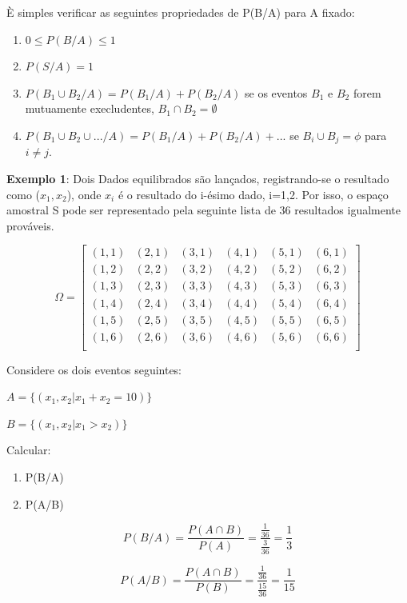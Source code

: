 È simples verificar as seguintes propriedades de P(B/A) para A
fixado:

\begin{enumerate}
    \item $0 \leq P(B/A) \leq 1$
    \item $P(S/A)=1$
     \item $P(B_{1} \cup B_{2}/A) = P(B_{1}/A)+P(B_{2}/A)$ se os
     eventos $B_{1}$ e $B_{2}$ forem mutuamente execludentes, $B_{1}\cap B_{2}=\emptyset$
     \item $P(B_{1} \cup B_{2} \cup ... / A) =
     P(B_{1}/A)+P(B_{2}/A)+...$ se $B_{i}\cup B_{j}=\phi$ para $i\neq
     j$.
\end{enumerate}



\textbf{Exemplo 1}: Dois Dados equilibrados são lançados,
registrando-se o resultado como ($x_{1},x_{2}$), onde $x_{i}$ é o
resultado do i-ésimo dado, i=1,2. Por isso, o espaço amostral S
pode ser representado pela seguinte lista de 36 resultados
igualmente prováveis.


$$
\Omega =
\left[%
\begin{array}{cccccc}
  (1,1) & (2,1) & (3,1) & (4,1) & (5,1) & (6,1) \\
  (1,2) & (2,2) & (3,2) & (4,2) & (5,2) & (6,2) \\
  (1,3) & (2,3) & (3,3) & (4,3) & (5,3) & (6,3) \\
  (1,4) & (2,4) & (3,4) & (4,4) & (5,4) & (6,4) \\
  (1,5) & (2,5) & (3,5) & (4,5) & (5,5) & (6,5) \\
  (1,6) & (2,6) & (3,6) & (4,6) & (5,6) & (6,6) \\
\end{array}%
\right]
$$

Considere os dois eventos seguintes:\vskip0.3cm

$A=\{(x_{1},x_{2}|x_{1}+x_{2}=10)\}$

$B=\{(x_{1},x_{2}|x_{1}>x_{2})\}$

\vskip0.3cm

Calcular:

\begin{enumerate}
    \item P(B/A)
    \item P(A/B)
\end{enumerate}


$$P(B/A)=\frac{P(A \cap
B)}{P(A)}=\frac{\frac{1}{36}}{\frac{3}{36}} = \frac{1}{3}$$


$$P(A/B)=\frac{P(A \cap
B)}{P(B)}=\frac{\frac{1}{36}}{\frac{15}{36}} = \frac{1}{15}$$


